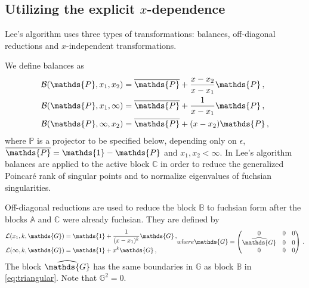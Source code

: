 \documentclass[12pt]{article}
\numberwithin{equation}{section}
\numberwithin{figure}{section}
\newcommand{\A}{\mathds{A}}
\newcommand{\B}{\mathds{B}}
\newcommand{\C}{\mathds{C}}
\newcommand{\G}{\mathds{G}}
\newcommand{\id}{\mathds{1}}
\renewcommand{\P}{\mathds{P}}
\newcommand{\Pbar}{\overline\P}
\begin{document}
    \subsection{Utilizing the explicit $x$-dependence}
      Lee's algorithm uses three types of transformations: balances, off-diagonal reductions and $x$-independent transformations.

      We define balances as
      \begin{subequations} \label{eq:bal}
        \begin{align}
          {\cal B}(\P,x_1,x_2) &= \Pbar + \frac{x-x_2}{x-x_1} \P\,, \label{eq:bal_x1_x2} \\
          {\cal B}(\P,x_1,\infty) &= \Pbar + \frac1{x-x_1} \P\,, \label{eq:bal_x1_inf} \\
          {\cal B}(\P,\infty,x_2) &= \Pbar + (x-x_2) \P\,, \label{eq:bal_inf_x2}
        \end{align}
      \end{subequations}        
      where $\P$ is a projector to be specified below, depending only on $\epsilon$, $\Pbar = \id - \P$ and $x_1,x_2 < \infty$.
			In Lee's algorithm balances are applied to the active block $\C$ in order to reduce the generalized Poincar\'{e} rank of singular points and to normalize eigenvalues of fuchsian singularities.
      
      Off-diagonal reductions are used to reduce the block $\B$ to fuchsian form after the blocks $\A$ and $\C$ were already fuchsian.
      They are defined by
      \begin{subequations} \label{eq:offred}
        \begin{align}
          {\cal L}(x_1,k,\G) &= \id + \frac1{(x-x_1)^k} \G\,, \label{eq:offred1} \\
          {\cal L}(\infty,k,\G) &= \id + x^k \G\,, \label{eq:offred2}
        \end{align}
        where
        \begin{equation} \label{eq:offredG}
          \G =
          \begin{pmatrix}
            0 & 0 & 0 \\ 
            \widehat\G & 0 & 0 \\ 
            0 & 0 & 0 
          \end{pmatrix}\,.
        \end{equation}
      \end{subequations}        
      The block $\widehat\G$ has the same boundaries in $\G$ as block $\B$ in \eqref{eq:triangular}. Note that $\G^2 = 0$.
\end{document}
